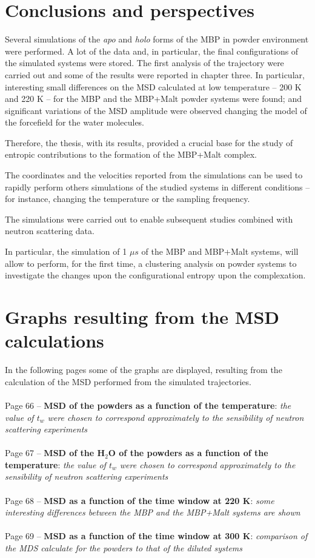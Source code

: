 \chapter*{Conclusions and perspectives} 
 
Several simulations of the \textit{apo} and \textit{holo} forms of the MBP  in powder environment were performed. 
A lot of the data and, in particular, the final configurations of the simulated systems were stored. The first analysis of the trajectory were carried out and some of the results were reported in chapter three. In particular, interesting small differences on the MSD calculated at low temperature -- 200 K and 220 K -- for the MBP and the MBP+Malt powder systems were found; and significant variations of the MSD amplitude were observed changing the model of the forcefield for the water molecules. 

Therefore, the thesis, with its results, provided a crucial base for the study of entropic contributions to the formation of the MBP+Malt complex. 

The coordinates and the velocities reported from the simulations can be used to rapidly perform others simulations of the studied systems in different conditions -- for instance, changing the temperature or the sampling frequency.

The simulations were carried out to enable subsequent studies combined with neutron scattering data.

In particular, the simulation of 1 $\mu s$ of the MBP and MBP+Malt systems, will allow to perform, for the first time, a clustering analysis on powder systems to investigate the changes upon the configurational entropy upon the complexation. 

\appendix
\chapter{Graphs resulting from the MSD calculations}\label{apendix:MSD}
\noindent
In the following pages some of the graphs are displayed, resulting from the calculation of the MSD performed from the simulated trajectories.\\
\\
Page 66 -- \textbf{MSD of the powders as a function of the temperature}:
\textit{the value of $t_w$ were chosen to correspond approximately to the sensibility of neutron scattering experiments}\\
\\
Page 67 -- \textbf{MSD of the H$_2$O of the powders as a function of the temperature}:
\textit{the value of $t_w$ were chosen to correspond approximately to the sensibility of neutron scattering experiments}\\
\\
Page 68 -- \textbf{MSD as a function of the time window at 220 K}:
\textit{some interesting differences between the MBP and the MBP+Malt systems are shown}\\
\\
Page 69 -- \textbf{MSD as a function of the time window at 300 K}:
\textit{comparison of the MDS calculate for the powders to that of the diluted systems}

